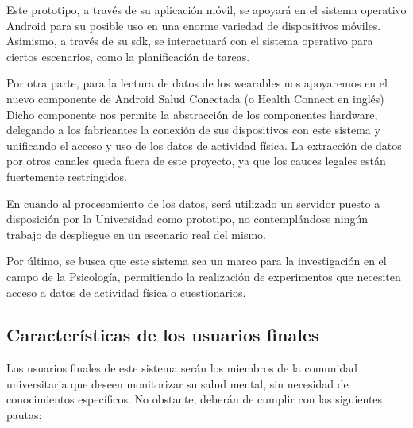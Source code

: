         Este prototipo, a través de su aplicación móvil, se apoyará en el sistema operativo Android para su posible uso en una enorme variedad de dispositivos móviles. Asimismo, a través de su \gls{sdk}, se interactuará con el sistema operativo para ciertos escenarios, como la planificación de tareas.

        Por otra parte, para la lectura de datos de los \glspl{wearable} nos apoyaremos en el nuevo componente de Android Salud Conectada (o Health Connect en inglés) Dicho componente nos permite la abstracción de los componentes hardware, delegando a los fabricantes la conexión de sus dispositivos con este sistema y unificando el acceso y uso de los datos de actividad física. La extracción de datos por otros canales queda fuera de este proyecto, ya que los cauces legales están fuertemente restringidos. 

        En cuando al procesamiento de los datos, será utilizado un servidor puesto a disposición por la Universidad como prototipo, no contemplándose ningún trabajo de despliegue en un escenario real del mismo.

        
        Por último, se busca que este sistema sea un marco para la investigación en el campo de la Psicología, permitiendo la realización de experimentos que necesiten acceso a datos de actividad física o cuestionarios.


    \subsection{Características de los usuarios finales}
        \label{req:descripcion:usuarios}

        
        Los usuarios finales de este sistema serán los miembros de la comunidad universitaria que deseen monitorizar su salud mental, sin necesidad de conocimientos específicos. No obstante, deberán de cumplir con las siguientes pautas:
    
